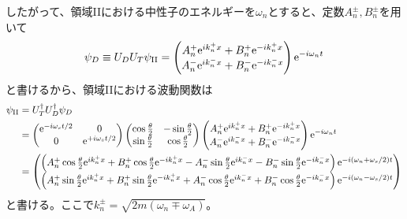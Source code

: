 \renewcommand{\arraystretch}{1.5}
したがって、領域IIにおける中性子のエネルギーを$\omega_n$とすると、定数$A_n^\pm,B_n^\pm$を用いて
\begin{equation}
\psi_D \equiv U_D U_T \psi_\mathrm{II} =\begin{pmatrix} A_n^+ \mathrm{e}^{ik_n^+x}+B_n^+\mathrm{e}^{-ik_n^+x} \\ A_n^- \mathrm{e}^{ik_n^-x}+B_n^-\mathrm{e}^{-ik_n^-x} \end{pmatrix} \mathrm{e}^{-i\omega_n t}
\end{equation}
と書けるから、領域IIにおける波動関数は
\begin{align}
\psi_\mathrm{II}&=U_T^\dagger U_D^\dagger \psi_D \notag \\
&=\begin{pmatrix} \mathrm{e}^{-i\omega_st/2} &0\\0&\mathrm{e}^{+i\omega_st/2}\end{pmatrix} \begin{pmatrix} \cos\frac{\theta}{2}& -\sin\frac{\theta}{2}\\  \sin\frac{\theta}{2}& \cos\frac{\theta}{2}\end{pmatrix} \begin{pmatrix} A_n^+ \mathrm{e}^{ik_n^+x}+B_n^+\mathrm{e}^{-ik_n^+x} \\ A_n^- \mathrm{e}^{ik_n^-x}+B_n^-\mathrm{e}^{-ik_n^-x} \end{pmatrix} \mathrm{e}^{-i\omega_n t} \notag \\
&=\begin{pmatrix} \left(A_n^+ \cos \frac{\theta}{2} \mathrm{e}^{ik_n^+x}+ B_n^+ \cos \frac{\theta}{2} \mathrm{e}^{-ik_n^+x} - A_n^- \sin \frac{\theta}{2} \mathrm{e}^{ik_n^-x}- B_n^- \sin \frac{\theta}{2} \mathrm{e}^{-ik_n^-x}\right) \mathrm{e}^{-i(\omega_n+\omega_s/2)t} \\ \left(A_n^+ \sin \frac{\theta}{2} \mathrm{e}^{ik_n^+x}+ B_n^+ \sin \frac{\theta}{2} \mathrm{e}^{-ik_n^+x} + A_n^- \cos \frac{\theta}{2} \mathrm{e}^{ik_n^-x}+ B_n^- \cos \frac{\theta}{2} \mathrm{e}^{-ik_n^-x}\right) \mathrm{e}^{-i(\omega_n-\omega_s/2)t} \end{pmatrix} \label{Nonreso_psi2}
\end{align}
と書ける。ここで$k_n^\pm=\sqrt{2m(\omega_n \mp \omega_A)}$。

